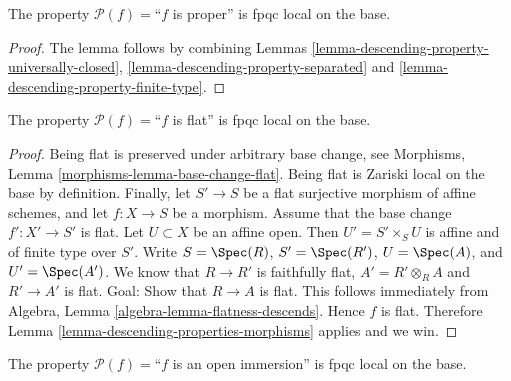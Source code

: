 \begin{lemma}
\label{lemma-descending-property-proper}
The property $\mathcal{P}(f) =$``$f$ is proper''
is fpqc local on the base.
\end{lemma}

\begin{proof}
The lemma follows by combining
Lemmas \ref{lemma-descending-property-universally-closed},
\ref{lemma-descending-property-separated}
and \ref{lemma-descending-property-finite-type}.
\end{proof}

\begin{lemma}
\label{lemma-descending-property-flat}
The property $\mathcal{P}(f) =$``$f$ is flat''
is fpqc local on the base.
\end{lemma}

\begin{proof}
Being flat is preserved under arbitrary base change, see
Morphisms, Lemma \ref{morphisms-lemma-base-change-flat}.
Being flat is Zariski local on the base by definition.
Finally, let
$S' \to S$ be a flat surjective morphism of affine schemes,
and let $f : X \to S$ be a morphism. Assume that the base change
$f' : X' \to S'$ is flat.
Let $U \subset X$ be an affine open. Then $U' = S' \times_S U$
is affine and of finite type over $S'$. Write
$S = \Spec(R)$,
$S' = \Spec(R')$,
$U = \Spec(A)$, and
$U' = \Spec(A')$.
We know that $R \to R'$ is faithfully flat,
$A' = R' \otimes_R A$ and $R' \to A'$ is flat.
Goal: Show that $R \to A$ is flat.
This follows immediately from
Algebra, Lemma \ref{algebra-lemma-flatness-descends}.
Hence $f$ is flat.
Therefore Lemma \ref{lemma-descending-properties-morphisms} applies and we win.
\end{proof}

\begin{lemma}
\label{lemma-descending-property-open-immersion}
The property $\mathcal{P}(f) =$``$f$ is an open immersion''
is fpqc local on the base.
\end{lemma}

